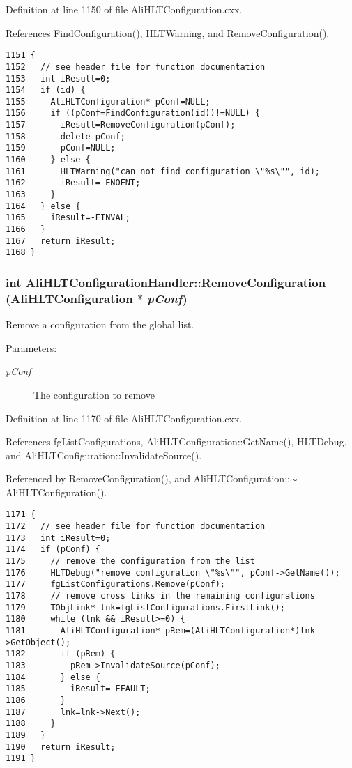 Definition at line 1150 of file Ali\-HLTConfiguration.cxx.

References Find\-Configuration(), HLTWarning, and Remove\-Configuration().

\footnotesize\begin{verbatim}1151 {
1152   // see header file for function documentation
1153   int iResult=0;
1154   if (id) {
1155     AliHLTConfiguration* pConf=NULL;
1156     if ((pConf=FindConfiguration(id))!=NULL) {
1157       iResult=RemoveConfiguration(pConf);
1158       delete pConf;
1159       pConf=NULL;
1160     } else {
1161       HLTWarning("can not find configuration \"%s\"", id);
1162       iResult=-ENOENT;
1163     }
1164   } else {
1165     iResult=-EINVAL;
1166   }
1167   return iResult;
1168 }
\end{verbatim}\normalsize 


\subsubsection{\setlength{\rightskip}{0pt plus 5cm}int Ali\-HLTConfiguration\-Handler::Remove\-Configuration ({\bf Ali\-HLTConfiguration} $\ast$ {\em p\-Conf})}\label{classAliHLTConfigurationHandler_a4}


Remove a configuration from the global list. \begin{Desc}
\item[Parameters:]
\begin{description}
\item[{\em p\-Conf}]The configuration to remove \end{description}
\end{Desc}


Definition at line 1170 of file Ali\-HLTConfiguration.cxx.

References fg\-List\-Configurations, Ali\-HLTConfiguration::Get\-Name(), HLTDebug, and Ali\-HLTConfiguration::Invalidate\-Source().

Referenced by Remove\-Configuration(), and Ali\-HLTConfiguration::$\sim$Ali\-HLTConfiguration().

\footnotesize\begin{verbatim}1171 {
1172   // see header file for function documentation
1173   int iResult=0;
1174   if (pConf) {
1175     // remove the configuration from the list
1176     HLTDebug("remove configuration \"%s\"", pConf->GetName());
1177     fgListConfigurations.Remove(pConf);
1178     // remove cross links in the remaining configurations
1179     TObjLink* lnk=fgListConfigurations.FirstLink();
1180     while (lnk && iResult>=0) {
1181       AliHLTConfiguration* pRem=(AliHLTConfiguration*)lnk->GetObject();
1182       if (pRem) {
1183         pRem->InvalidateSource(pConf);
1184       } else {
1185         iResult=-EFAULT;
1186       }
1187       lnk=lnk->Next();
1188     }
1189   }
1190   return iResult;
1191 }
\end{verbatim}\normalsize 




